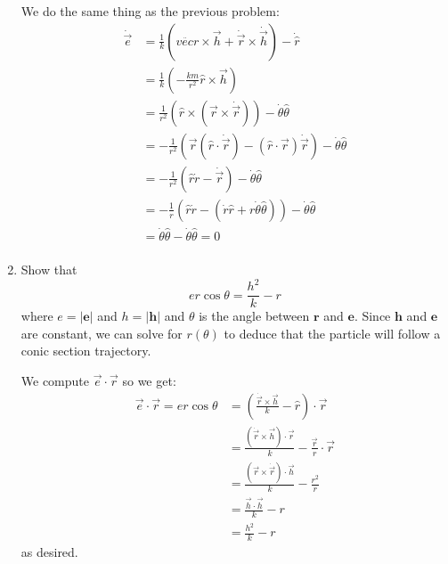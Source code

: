 \documentclass[10pt]{article}
\begin{document}
\begin{enumerate}[label=\alph*)]
					\begin{solution}
							We do the same thing as the previous problem: 
							\begin{align*}
									\dot{\vec e} &= \frac{1}{k}\left( \ddot{vec r} \times \vec h
									 + \dot{\vec r} \times \dot{\vec h} \right) - \dot{\hat{r}} \\
												 &= \frac{1}{k}\left( -\frac{km}{r^2}\hat{r}\times \vec{h} 
												 \right)  \\
												 &= \frac{1}{r^2}(\hat{r}\times (\vec{r} \times \dot{\vec r}))
												 - \dot \theta \hat{\theta}\\
												 &= -\frac{1}{r^2}\left( \vec{r}(\hat{r}\cdot \dot{\vec r}) -
												 (\hat{r} \cdot \vec r) \dot{\vec r}\right)  - 
												 \dot \theta \hat{\theta}\\
												 &= -\frac{1}{r^2}\left( \hat{r}\dot{r} - \dot{\vec r} \right) -
												 \dot{\theta} \hat{\theta}\\
												 &= -\frac{1}{r}\left( \hat{r}\dot r - (\dot r \hat{r} 
												 + r\dot \theta \hat{\theta}) \right) -
												 	\dot \theta \hat{\theta} \\
												 &= \dot{\theta} \hat{\theta} - \dot \theta \hat{\theta} = 0 \\
							\end{align*}
					\end{solution}
			\item Show that 
					\[ er \cos \theta = \frac{h^2}{k}-r\]
					where $e = |\mathbf e|$ and $h = |\mathbf h|$ and $\theta$ is the angle between $\mathbf r$
					and $\mathbf e$. Since $\mathbf h$ and $\mathbf e$ are constant, we can solve for 
					$r(\theta)$ to deduce that the particle will follow a conic section trajectory.

					\begin{solution}
							We compute $\vec{e} \cdot \vec{r}$ so we get: 
							\begin{align*}
									\vec{e} \cdot \vec{r} = er\cos \theta &=
									\left( \frac{\dot{\vec{r}} \times \vec{h}}{k} -
									\hat{r} \right)\cdot \vec{r}  \\  
									&= \frac{(\dot{\vec{r}} \times \vec{h})\cdot \vec{r}}{k} -
									\frac{\vec{r}}{r} \cdot \vec{r} \\
									&= \frac{(\vec{r}\times \dot{\vec{r}}) \cdot \vec{h}}{k} - \frac{r^2}{r} \\
									&= \frac{\vec{h} \cdot \vec{h}}{k}-r  \\
									&= \frac{h^2}{k} - r 
							\end{align*}
							as desired. 
					\end{solution}

	\end{enumerate}
\end{document}
